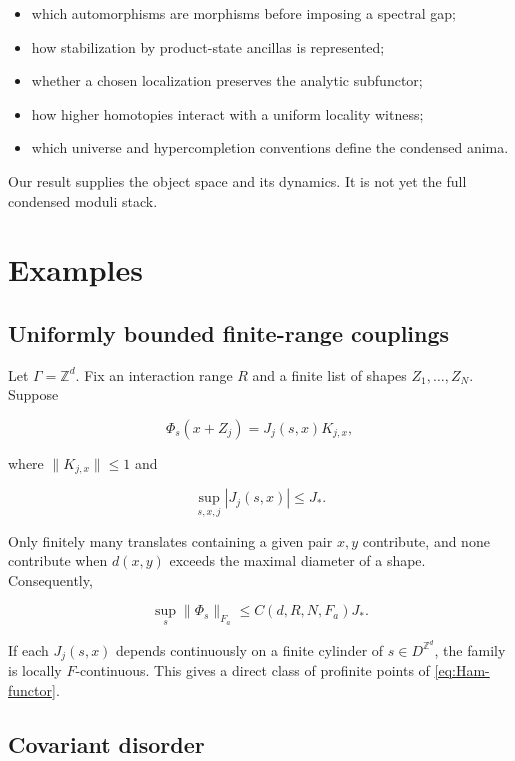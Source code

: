 \documentclass[12pt]{article}
\theoremstyle{definition}
\theoremstyle{remark}
\begin{document}
\begin{itemize}[leftmargin=2.3em]
\item which automorphisms are morphisms before imposing a spectral gap;
\item how stabilization by product-state ancillas is represented;
\item whether a chosen localization preserves the analytic subfunctor;
\item how higher homotopies interact with a uniform locality witness;
\item which universe and hypercompletion conventions define the condensed
anima.
\end{itemize}

Our result supplies the object space and its dynamics.  It is not yet the full
condensed moduli stack.

\section{Examples}

\subsection{Uniformly bounded finite-range couplings}

Let $\Gamma=\mathbb Z^d$.  Fix an interaction range $R$ and a finite list of
shapes $Z_1,\ldots,Z_N$.  Suppose

\begin{equation}
  \Phi_s(x+Z_j)=J_j(s,x)K_{j,x},
\end{equation}

where $\|K_{j,x}\|\le1$ and

\begin{equation}
  \sup_{s,x,j}|J_j(s,x)|\le J_*.
\end{equation}

Only finitely many translates containing a given pair $x,y$ contribute, and
none contribute when $d(x,y)$ exceeds the maximal diameter of a shape.
Consequently,

\begin{equation}
  \sup_s\|\Phi_s\|_{F_a}
  \le C(d,R,N,F_a)J_*.
\end{equation}

If each $J_j(s,x)$ depends continuously on a finite cylinder of $s\in
D^{\mathbb Z^d}$, the family is locally $F$-continuous.  This gives a direct
class of profinite points of \cref{eq:Ham-functor}.

\subsection{Covariant disorder}
\end{document}
